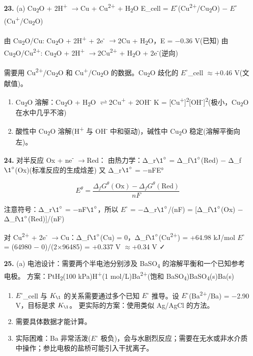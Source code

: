 \documentclass[a4paper,11pt]{ctexart}
\newcommand{\箭}{\ensuremath{\rightarrow}}
\newcommand{\左箭}{\ensuremath{\leftarrow}}
\newcommand{\上箭}{\ensuremath{\uparrow}}
\newcommand{\下箭}{\ensuremath{\downarrow}}
\newcommand{\衡}{\ensuremath{\rightleftharpoons}}
\newcommand{\双箭}{\ensuremath{\leftrightarrow}}
\newcommand{\约等于}{\ensuremath{\approx}}
\newcommand{\小于等于}{\ensuremath{\leq}}
\newcommand{\大于等于}{\ensuremath{\geq}}
\newcommand{\不等于}{\ensuremath{\neq}}
\newcommand{\西格马}{\ensuremath{\sigma}}
\newcommand{\派}{\ensuremath{\pi}}
\begin{document}
\textbf{23.}
(a) Cu\textsubscript{2}O + 2H\textsuperscript{+} \箭 Cu + Cu\textsuperscript{2+} + H\textsubscript{2}O
E\_cell = \(E^{\circ}\)(Cu\textsuperscript{2+}/Cu\textsubscript{2}O) − \(E^{\circ}\)(Cu\textsuperscript{+}/Cu\textsubscript{2}O)

由 Cu\textsubscript{2}O/Cu: Cu\textsubscript{2}O + 2H\textsuperscript{+} + 2e\textsuperscript{-} \箭 2Cu + H\textsubscript{2}O，E = −0.36 V(已知)
由 Cu\textsubscript{2}O/Cu\textsuperscript{2+}: Cu\textsubscript{2}O + 2H\textsuperscript{+} \箭 2Cu\textsuperscript{2+} + H\textsubscript{2}O + 2e\textsuperscript{-}(逆向)

需要用 Cu\textsuperscript{2+}/Cu\textsubscript{2}O 和 Cu\textsuperscript{+}/Cu\textsubscript{2}O 的数据。Cu\textsubscript{2}O 歧化的 \(E^{\circ}\)\_cell \约等于 +0.46 V(文献值)。

\begin{enumerate}
\def\labelenumi{(\alph{enumi})}
\setcounter{enumi}{1}
\item
  Cu\textsubscript{2}O 溶解：Cu\textsubscript{2}O + H\textsubscript{2}O \衡 2Cu\textsuperscript{+} + 2OH\textsuperscript{-}
  K = {[}Cu\textsuperscript{+}{]}\textsuperscript{2}{[}OH\textsuperscript{-}{]}\textsuperscript{2}(极小，Cu\textsubscript{2}O 在水中几乎不溶)
\item
  酸性中 Cu\textsubscript{2}O 溶解(H\textsuperscript{+} 与 OH\textsuperscript{-} 中和驱动)，碱性中 Cu\textsubscript{2}O 稳定(溶解平衡向左)。
\end{enumerate}

\textbf{24.} 对半反应 Ox + ne\textsuperscript{-} \箭 Red：
由热力学：Δ\_r\(\1^{\circ}\) = Δ\_f\(\1^{\circ}\)(Red) − Δ\_f\(\1^{\circ}\)(Ox)(标准反应的生成焓差)
又 Δ\_r\(\1^{\circ}\) = −nFE°

\[E^\theta = \frac{\Delta_f G^\theta(\mathrm{Ox}) - \Delta_f G^\theta(\mathrm{Red})}{nF}\]

注意符号：Δ\_r\(\1^{\circ}\) = −nF\(\1^{\circ}\)，所以 \(E^{\circ}\) = −Δ\_r\(\1^{\circ}\)/(nF) = {[}Δ\_f\(\1^{\circ}\)(Ox) − Δ\_f\(\1^{\circ}\)(Red){]}/(nF)

对 Cu\textsuperscript{2+} + 2e\textsuperscript{-} \箭 Cu：Δ\_f\(\1^{\circ}\)(Cu) = 0，Δ\_f\(\1^{\circ}\)(Cu\textsuperscript{2+}) = +64.98 kJ/mol
\(E^{\circ}\) = (64980 − 0)/(2×96485) = +0.337 V \约等于 +0.34 V ✓

\textbf{25.}
(a) 电池设计：需要两个半电池分别涉及 BaSO\textsubscript{4} 的溶解平衡和一个已知参考电极。
方案：Pt\textbar H\textsubscript{2}(100 kPa)\textbar H\textsuperscript{+}(1 mol/L)\textbar\textbar Ba\textsuperscript{2+}(饱和 BaSO\textsubscript{4})\textbar BaSO\textsubscript{4}(s)\textbar Ba(s)

\begin{enumerate}
\def\labelenumi{(\alph{enumi})}
\setcounter{enumi}{1}
\item
  \(E^{\circ}\)\_cell 与 \(K_{\1}\) 的关系需要通过多个已知 \(E^{\circ}\) 推导。设 \(E^{\circ}\)(Ba\textsuperscript{2+}/Ba) = −2.90 V，目标是求 \(K_{\1}\)。
  更实际的方案：使用类似 Ag/AgCl 的方法。
\item
  需要具体数据才能计算。
\item
  实际困难：Ba 非常活泼(\(E^{\circ}\) 极负)，会与水剧烈反应；需要在无水或非水介质中操作；参比电极的盐桥可能引入干扰离子。
\end{enumerate}
\end{document}
